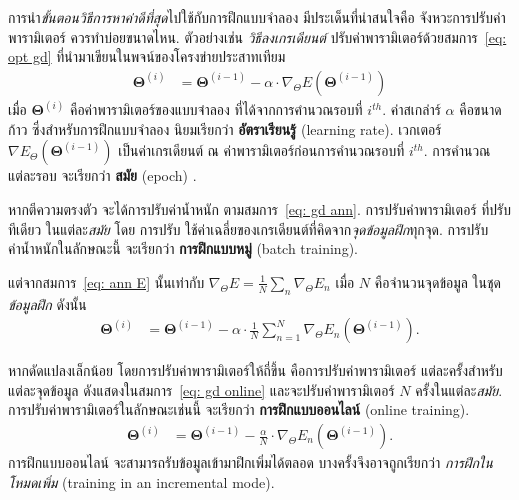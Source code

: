 การนำ\textit{ขั้นตอนวิธีการหาค่าดีที่สุด}ไปใช้กับการฝึกแบบจำลอง มีประเด็นที่น่าสนใจคือ
จังหวะการปรับค่าพารามิเตอร์
ควรทำบ่อยขนาดไหน.
ตัวอย่างเช่น \textit{วิธีลงเกรเดียนต์}
ปรับค่าพารามิเตอร์ด้วยสมการ~\ref{eq: opt gd} ที่นำมาเขียนในพจน์ของโครงข่ายประสาทเทียม
\begin{align}
\bm{\Theta}^{(i)}
&=
\bm{\Theta}^{(i-1)}
- \alpha \cdot
\nabla_{\Theta} E \left(\bm{\Theta}^{(i-1)}\right)
\label{eq: gd ann}
\end{align}
เมื่อ
$\bm{\Theta}^{(i)}$
คือค่าพารามิเตอร์ของแบบจำลอง
ที่ได้จากการคำนวณรอบที่ $i^{th}$.
ค่าสเกล่าร์
$\alpha$ คือขนาดก้าว
ซึ่งสำหรับการฝึกแบบจำลอง
นิยมเรียกว่า
\textbf{อัตราเรียนรู้} (learning rate).
เวกเตอร์
$\nabla E_{\Theta} \left(\bm{\Theta}^{(i-1)}\right)$
เป็นค่าเกรเดียนต์
ณ ค่าพารามิเตอร์ก่อนการคำนวณรอบที่ $i^{th}$.
การคำนวณแต่ละรอบ จะเรียกว่า \textbf{สมัย} (epoch)
.

หากตีความตรงตัว จะได้การปรับค่าน้ำหนัก ตามสมการ~\ref{eq: gd ann}.
การปรับค่าพารามิเตอร์ ที่ปรับทีเดียว ในแต่ละ\textit{สมัย} 
โดย
การปรับ
ใช้ค่าเฉลี่ยของเกรเดียนต์ที่คิดจาก\textit{จุดข้อมูลฝึก}ทุกจุด.
การปรับค่าน้ำหนักในลักษณะนี้ จะเรียกว่า
\textbf{การฝึกแบบหมู่} (batch training).

แต่จากสมการ~\ref{eq: ann E}
นั้นเท่ากับ
$\nabla_{\Theta} E = \frac{1}{N} \sum_n \nabla_{\Theta} E_n$
เมื่อ $N$ คือจำนวนจุดข้อมูล
ในชุด\textit{ข้อมูลฝึก}
ดังนั้น
\begin{align}
\bm{\Theta}^{(i)}
&=
\bm{\Theta}^{(i-1)}
- \alpha \cdot
\frac{1}{N} \sum_{n=1}^N \nabla_{\Theta} E_n \left(\bm{\Theta}^{(i-1)}\right)
\label{eq: gd batch}.
\end{align}

หากดัดแปลงเล็กน้อย
โดยการปรับค่าพารามิเตอร์ให้ถี่ขึ้น
คือการปรับค่าพารามิเตอร์
แต่ละครั้งสำหรับแต่ละจุดข้อมูล ดังแสดงในสมการ~\ref{eq: gd online}
และจะปรับค่าพารามิเตอร์
$N$ ครั้งในแต่ละ\textit{สมัย}.
การปรับค่าพารามิเตอร์ในลักษณะเช่นนี้ จะเรียกว่า \textbf{การฝึกแบบออนไลน์} (online training).
\begin{align}
\bm{\Theta}^{(i)}
&=
\bm{\Theta}^{(i-1)}
- 
\frac{\alpha}{N} \cdot \nabla_{\Theta} E_n \left(\bm{\Theta}^{(i-1)}\right)
\label{eq: gd online}.
\end{align}
การฝึกแบบออนไลน์ จะสามารถรับข้อมูลเข้ามาฝึกเพิ่มได้ตลอด
บางครั้งจึงอาจถูกเรียกว่า \textit{การฝึกในโหมดเพิ่ม} (training in an incremental mode).

